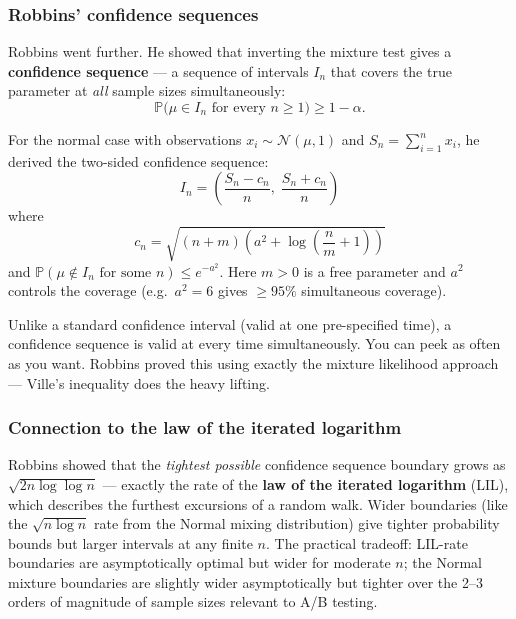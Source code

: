 \documentclass[12pt, a4paper]{article}
\newcommand{\Prob}{\mathbb{P}}         %
\begin{document}
\subsubsection*{Robbins' confidence sequences}

Robbins went further.  He showed that inverting the mixture test gives a
\textbf{confidence sequence} --- a sequence of intervals $I_n$ that covers
the true parameter at \emph{all} sample sizes simultaneously:
\[
  \Prob\!\bigl(\mu \in I_n \text{ for every } n \geq 1\bigr) \geq 1 - \alpha.
\]

For the normal case with observations $x_i \sim \mathcal{N}(\mu, 1)$ and
$S_n = \sum_{i=1}^n x_i$, he derived the two-sided confidence sequence:
\[
  \boxed{I_n = \left(\frac{S_n - c_n}{n},\; \frac{S_n + c_n}{n}\right)}
\]
where
\[
  c_n = \sqrt{(n+m)\!\left(a^2 + \log\!\left(\frac{n}{m}+1\right)\right)}
\]
and $\Prob(\mu \notin I_n \text{ for some } n) \leq e^{-a^2}$.
Here $m > 0$ is a free parameter and $a^2$ controls the coverage (e.g.\
$a^2 = 6$ gives $\geq 95\%$ simultaneous coverage).

\begin{plainlanguage}
Unlike a standard confidence interval (valid at one pre-specified time),
a confidence sequence is valid at every time simultaneously.  You can peek
as often as you want.  Robbins proved this using exactly the mixture
likelihood approach --- Ville's inequality does the heavy lifting.
\end{plainlanguage}

\subsubsection*{Connection to the law of the iterated logarithm}

\begin{historynote}
Robbins showed that the \emph{tightest possible} confidence sequence boundary
grows as $\sqrt{2n \log \log n}$ --- exactly the rate of the \textbf{law of
the iterated logarithm} (LIL), which describes the furthest excursions of
a random walk.  Wider boundaries (like the $\sqrt{n \log n}$ rate from the
Normal mixing distribution) give tighter probability bounds but larger
intervals at any finite $n$.  The practical tradeoff: LIL-rate boundaries are
asymptotically optimal but wider for moderate $n$; the Normal mixture boundaries
are slightly wider asymptotically but tighter over the 2--3 orders of
magnitude of sample sizes relevant to A/B testing.
\end{historynote}
\end{document}
